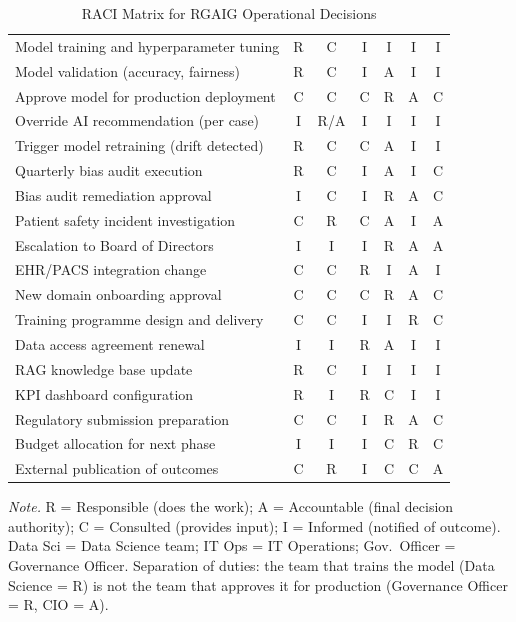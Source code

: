 \tablefontsize
\begin{xltabular}
{\textwidth}{@{} L C C C C C C @{}}
\caption{RACI Matrix for RGAIG Operational Decisions}\label{tab:dt_raci} \\
\toprule
{} &  &  &  &  &  &  \\
\midrule
\endfirsthead
\endhead
\bottomrule
\endlastfoot
Model training and hyperparameter tuning & R & C & I & I & I & I \\
Model validation (accuracy, fairness) & R & C & I & A & I & I \\
Approve model for production deployment & C & C & C & R & A & C \\
Override AI recommendation (per case) & I & R/A & I & I & I & I \\
Trigger model retraining (drift detected) & R & C & C & A & I & I \\
Quarterly bias audit execution & R & C & I & A & I & C \\
Bias audit remediation approval & I & C & I & R & A & C \\
Patient safety incident investigation & C & R & C & A & I & A \\
Escalation to Board of Directors & I & I & I & R & A & A \\
EHR/PACS integration change & C & C & R & I & A & I \\
New domain onboarding approval & C & C & C & R & A & C \\
Training programme design and delivery & C & C & I & I & R & C \\
Data access agreement renewal & I & I & R & A & I & I \\
RAG knowledge base update & R & C & I & I & I & I \\
KPI dashboard configuration & R & I & R & C & I & I \\
Regulatory submission preparation & C & C & I & R & A & C \\
Budget allocation for next phase & I & I & I & C & R & C \\
External publication of outcomes & C & R & I & C & C & A \\
\end{xltabular}
\vspace{0.5em}\noindent\textit{Note.} R = Responsible (does the work); A = Accountable (final decision authority); C = Consulted (provides input); I = Informed (notified of outcome). Data Sci = Data Science team; IT Ops = IT Operations; Gov.\ Officer = Governance Officer. Separation of duties: the team that trains the model (Data Science = R) is not the team that approves it for production (Governance Officer = R, CIO = A).

